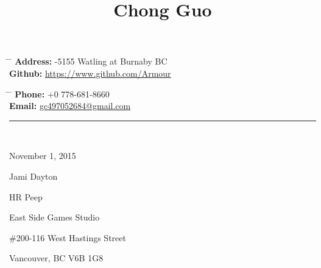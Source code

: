 \documentclass[10pt]{article} %
\begin{document}

\title{Chong Guo} %


\parbox{0.5\textwidth}{ %
\begin{tabbing} %
\hspace{3cm} \= \hspace{4cm} \= \kill %
{\bf Address:} -5155 Watling at Burnaby BC \\[2mm] %
{\bf Github:} \> \href{https://www.github.com/Armour}{https://www.github.com/Armour} \\ %
\end{tabbing}
\vspace{-3mm}
}
\hfill %
\parbox{0.5\textwidth}{ %
\begin{tabbing} %
\hspace{3cm} \= \hspace{4cm} \= \kill %
{\bf Phone:} \> +0 778-681-8660 \\[2mm] %
{\bf Email:} \> \href{mailto:gc497052684@gmail.com}{gc497052684@gmail.com} \\ %
\end{tabbing}
\vspace{-3mm}
}
\rule{\textwidth}{0.5mm}\\ %


\font


\vspace{6mm}
November 1, 2015

\vspace{4mm}

Jami Dayton

HR Peep

East Side Games Studio

\#200-116 West Hastings Street

Vancouver, BC V6B 1G8

\vspace{4mm}
\end{document}
